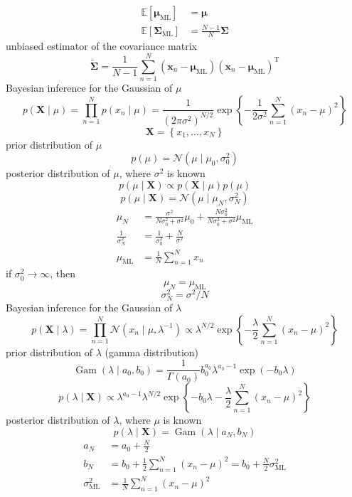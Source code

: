 \documentclass{article}
\begin{document}
	$$
	\begin{aligned}
	\mathbb{E}\left[\boldsymbol{\mu}_{\mathrm{ML}}\right] &=\boldsymbol{\mu} \\
	\mathbb{E}\left[\boldsymbol{\Sigma}_{\mathrm{ML}}\right] &=\frac{N-1}{N} \boldsymbol{\Sigma}
	\end{aligned}
	$$
	unbiased estimator of the covariance matrix
	$$
	\widetilde{\boldsymbol{\Sigma}}=\frac{1}{N-1} \sum_{n=1}^{N}\left(\mathbf{x}_{n}-\boldsymbol{\mu}_{\mathrm{ML}}\right)\left(\mathbf{x}_{n}-\boldsymbol{\mu}_{\mathrm{ML}}\right)^{\mathrm{T}}
	$$
	Bayesian inference for the Gaussian of $\mu$
	$$
	p(\mathbf{X} \mid \mu)=\prod_{n=1}^{N} p\left(x_{n} \mid \mu\right)=\frac{1}{\left(2 \pi \sigma^{2}\right)^{N / 2}} \exp \left\{-\frac{1}{2 \sigma^{2}} \sum_{n=1}^{N}\left(x_{n}-\mu\right)^{2}\right\}
	$$
	$$
	\mathbf{X}=\left\{x_{1}, \ldots, x_{N}\right\}
	$$
	prior distribution of $\mu$
	$$
	p(\mu)=\mathcal{N}\left(\mu \mid \mu_{0}, \sigma_{0}^{2}\right)
	$$
	posterior distribution of $\mu$, where $\sigma^2$ is known
	$$
	p(\mu \mid \mathbf{X}) \propto p(\mathbf{X} \mid \mu) p(\mu)
	$$
	$$
	p(\mu \mid \mathbf{X})=\mathcal{N}\left(\mu \mid \mu_{N}, \sigma_{N}^{2}\right)
	$$
	$$
	\begin{aligned}
	\mu_{N} &=\frac{\sigma^{2}}{N \sigma_{0}^{2}+\sigma^{2}} \mu_{0}+\frac{N \sigma_{0}^{2}}{N \sigma_{0}^{2}+\sigma^{2}} \mu_{\mathrm{ML}} \\
	\frac{1}{\sigma_{N}^{2}} &=\frac{1}{\sigma_{0}^{2}}+\frac{N}{\sigma^{2}}\\
	\mu_{\mathrm{ML}}&=\frac{1}{N} \sum_{n=1}^{N} x_{n}
	\end{aligned}
	$$
	if $\sigma_{0}^{2} \rightarrow \infty$, then
	$$
	\mu_{N}=\mu_{\mathrm{ML}}
	$$
	$$
	\sigma_{N}^{2}=\sigma^{2} / N
	$$
	Bayesian inference for the Gaussian of $\lambda$
	$$
	p(\mathbf{X} \mid \lambda)=\prod_{n=1}^{N} \mathcal{N}\left(x_{n} \mid \mu, \lambda^{-1}\right) \propto \lambda^{N / 2} \exp \left\{-\frac{\lambda}{2} \sum_{n=1}^{N}\left(x_{n}-\mu\right)^{2}\right\}
	$$
	prior distribution of $\lambda$ (gamma distribution)
	$$
	\operatorname{Gam}(\lambda \mid a_0, b_0)=\frac{1}{\Gamma(a_0)} b_0^{a_0} \lambda^{a_0-1} \exp (-b_0 \lambda)
	$$
	$$
	p(\lambda \mid \mathbf{X}) \propto \lambda^{a_{0}-1} \lambda^{N / 2} \exp \left\{-b_{0} \lambda-\frac{\lambda}{2} \sum_{n=1}^{N}\left(x_{n}-\mu\right)^{2}\right\}
	$$
	posterior distribution of $\lambda$, where $\mu$ is known
	$$
	p(\lambda \mid \mathbf{X})=\operatorname{Gam}\left(\lambda \mid a_{N}, b_{N}\right)
	$$
	$$
	\begin{aligned}
	a_{N} &=a_{0}+\frac{N}{2} \\
	b_{N} &=b_{0}+\frac{1}{2} \sum_{n=1}^{N}\left(x_{n}-\mu\right)^{2}=b_{0}+\frac{N}{2} \sigma_{\mathrm{ML}}^{2} \\
	\sigma_{\mathrm{ML}}^{2}&=\frac{1}{N} \sum_{n=1}^{N}\left(x_{n}-\mu\right)^{2}
	\end{aligned}
	$$
\end{document}
